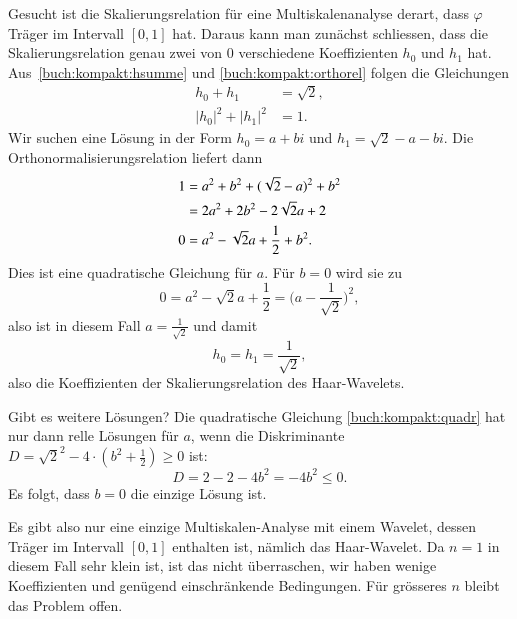 \begin{beispiel}
Gesucht ist die Skalierungsrelation für eine Multiskalenanalyse derart,
dass $\varphi$ Träger im Intervall $[0,1]$ hat.
Daraus kann man zunächst schliessen, dass die Skalierungsrelation
genau zwei von $0$ verschiedene Koeffizienten $h_0$ und $h_1$ hat.
Aus~\eqref{buch:kompakt:hsumme} und \eqref{buch:kompakt:orthorel}
folgen die Gleichungen
\begin{align*}
h_0+h_1&=\sqrt{2},
\\
|h_0|^2+|h_1|^2&=1.
\end{align*}
Wir suchen eine Lösung in der Form $h_0=a+bi$ und $h_1=\sqrt{2}-a-bi$.
Die Orthonormalisierungsrelation liefert dann
\begin{align}
1
&=
a^2 + b^2
+
(\sqrt{2}-a)^2 + b^2
\notag
\\
&=
2a^2 + 2b^2 - 2\sqrt{2}a + 2
\notag
\\
0
&=
a^2 - \sqrt{2}a + \frac12 + b^2.
\label{buch:kompakt:quadr}
\end{align}
Dies ist eine quadratische Gleichung für $a$.
Für $b=0$ wird sie zu
\[
0
=
a^2 - \sqrt{2}a + \frac12
=
\biggl(a-\frac1{\sqrt{2}}\biggr)^2,
\]
also ist in diesem Fall $a=\frac1{\sqrt{2}}$ und damit
\[
h_0=h_1=\frac{1}{\sqrt{2}},
\]
also die Koeffizienten der Skalierungsrelation des Haar-Wavelets.

Gibt es weitere Lösungen?
Die quadratische Gleichung \eqref{buch:kompakt:quadr} hat nur dann
relle Lösungen für $a$, wenn die Diskriminante
$D=\sqrt{2}^2 - 4\cdot (b^2+\frac12) \ge 0$ ist:
\[
D=2-2-4b^2 =-4b^2\le 0.
\]
Es folgt, dass $b=0$ die einzige Lösung ist.
\end{beispiel}

Es gibt also nur eine einzige Multiskalen-Analyse mit einem Wavelet,
dessen Träger im Intervall $[0,1]$ enthalten ist, nämlich das Haar-Wavelet.
Da $n=1$ in diesem Fall sehr klein ist, ist das nicht überraschen, wir
haben wenige Koeffizienten und genügend einschränkende Bedingungen.
Für grösseres $n$ bleibt das Problem offen.

